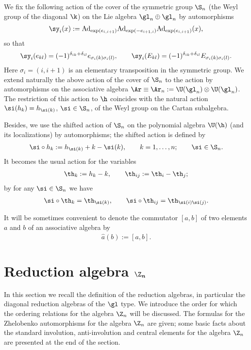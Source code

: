 \documentclass[pdftex]{sigma}
\numberwithin{equation}{section}
\begin{document}
We f\/ix the following action of the cover of the symmetric group $\S_n$ (the Weyl group of the
diagonal $\k$) on the Lie algebra $\gl_n\oplus\gl_n$ by automorphisms
\begin{gather*}
\sy_i(x):=\mathrm{Ad}_{\exp(e_{i,i+1})}\mathrm{Ad}_{\exp(-e_{i+1,i})}\mathrm{Ad}_{\exp(e_{i,i+1})}(x) ,
\end{gather*}
so that
\begin{gather*}\sy_i(e_{kl})=(-1)^{\delta_{ik}+\delta_{il}}e_{\sigma_i(k)\sigma_i(l)} ,
\qquad\sy_i(E_{kl})=(-1)^{\delta_{ik}+\delta_{il}}E_{\sigma_i(k)\sigma_i(l)}.
\end{gather*}
Here $\sigma_i=(i,i+1)$ is an elementary transposition in the symmetric group. We extend naturally the above action of the cover of $\S_n$ to the action by
automorphisms on the associative algebra $\Ar\equiv\Ar_n:=\U(\gl_n)\otimes \U(\gl_n)$. The restriction of this action to $\h$ coincides
with the natural action $\si(h_{k})=h_{\si(k)}$, $\si\in\S_n$,  of the Weyl group on the Cartan subalgebra.


Besides, we use the shifted action of $\S_n$ on the polynomial algebra $\U(\h)$ (and its localizations) by automorphisms; the shifted action is def\/ined by
\begin{gather}
\label{not1}
\si\circ h_k:= h_{\si(k)}+k-\si(k) ,\qquad k=1,\dots ,n;\qquad \si\in\S_n .
\end{gather}
It becomes the usual action for the variables
\begin{gather}
 \th_k:=h_k-k ,\qquad \th_{ij}:=\th_i-\th_j; \label{hrond}
\end{gather}
by  for any $\si\in\S_n$ we have
\begin{gather*}
\si\circ\th_k=\th_{\si(k)} ,\qquad \si\circ\th_{ij}=\th_{\si(i)\si(j)} .
\end{gather*}

It will be sometimes convenient to denote the commutator $[a,b]$ of two elements $a$ and $b$ of an associative algebra by
\begin{gather}
 \hat{a}(b):=[a,b] .\label{dehaco}
\end{gather}


\section[Reduction algebra $\Z_n$]{Reduction algebra $\boldsymbol{\Z_n}$}\label{section2}

In this section we recall the def\/inition of the reduction algebras, in particular the diagonal reduction algebras of the $\gl$ type.
We introduce the order for which
the ordering relations for the algebra $\Z_n$ will be discussed.
The formulas for the Zhelobenko automorphisms for the algebra $\Z_n$ are given; some basic facts about the standard involution, anti-involution
and central elements for the algebra $\Z_n$ are presented at the end of the section.
\end{document}

